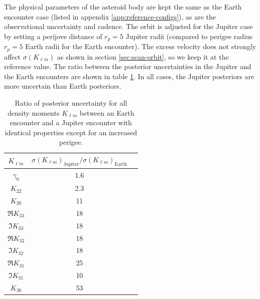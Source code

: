 \documentclass[fleqn,usenatbib]{mnras}
\begin{document}
The physical parameters of the asteroid body are kept the same as the Earth encounter case (listed in appendix \ref{app:reference-configs}), as are the observational uncertainty and cadence. The orbit is adjusted for the Jupiter case by setting a perijove distance of $r_p=5$ Jupiter radii (compared to perigee radius $r_p=5$ Earth radii for the Earth encounter). The excess velocity does not strongly affect $\sigma(K_{\ell m})$ as shown in section \ref{sec:scan-orbit}, so we keep it at the reference value. %
The ratio between the posterior uncertainties in the Jupiter and the Earth encounters are shown in table \ref{tab:jupiter-uncertainty}. In all cases, the Jupiter posteriors are more uncertain than Earth posteriors.

\begin{table}
  \centering
  \begin{tabular}{c|cc}
    \hline 
    $K_{\ell m}$ & $\sigma(K_{\ell m})_\text{Jupiter}/\sigma(K_{\ell m})_\text{Earth}$\\ \hline 
    $\gamma_0$ & 1.6 \\
    $K_{22}$ & 2.3 \\
    $K_{20}$ & 11 \\
    $\Re K_{33}$ & 18 \\
    $\Im K_{33}$ & 18 \\
    $\Re K_{32}$ & 18 \\
    $\Im K_{32}$ & 18 \\
    $\Re K_{31}$ & 25 \\
    $\Im K_{31}$ & 10 \\
    $K_{30}$ & 53 \\ \hline
  \end{tabular}
  \caption{Ratio of posterior uncertainty for all density moments $K_{\ell m}$ between an Earth encounter and a Jupiter encounter with identical properties except for an increased perigee.}
  \label{tab:jupiter-uncertainty}
\end{table}
\end{document}
